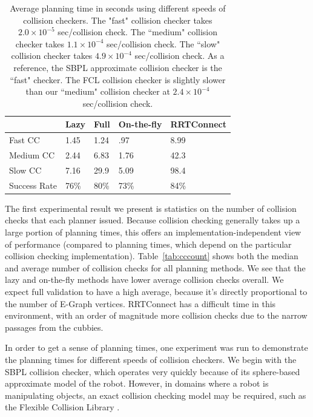 \documentclass[letterpaper, 10 pt, conference]{ieeeconf}  %
\newcommand{\tabref}[1]{Table~\ref{tab:#1}}
\newcommand{\tablab}[1]{\label{tab:#1}}
\begin{document}
\begin{table}[h]
    \begin{center}
        \begin{tabular}{| l | l | l | l | l | }
            \hline
            & Lazy & Full & On-the-fly & RRTConnect \\ \hline
            Fast CC & 1.45 & 1.24 & .97 & 8.99 \\ \hline
            Medium CC & 2.44 & 6.83 & 1.76 & 42.3\\ \hline
            Slow CC & 7.16 & 29.9 & 5.09 & 98.4 \\ \hline
            Success Rate& 76\% & 80\% & 73\% & 84\% \\ \hline
        \end{tabular}
    \end{center}
    \caption{Average planning time in seconds using different speeds of
    collision checkers. The "fast" collision checker takes $2.0\times10^{-5}$
sec/collision check. The ``medium" collision checker takes $1.1\times10^{-4}$
sec/collision check. The ``slow" collision checker takes $4.9\times10^{-4}$
sec/collision check. As a reference, the SBPL approximate collision checker is
the ``fast" checker. The FCL collision checker is slightly slower than our
``medium" collision checker at $2.4\times10^{-4}$ sec/collision check.
}
    \tablab{ptimes}
\end{table}

The first experimental result we present is statistics on the number of
collision checks that each planner issued. Because collision checking generally
takes up a large portion of planning times, this offers an
implementation-independent view of performance (compared to planning times, which
depend on the particular collision checking implementation).  \tabref{cccount}
shows both the median and average number of collision checks for all planning
methods. We see that the lazy and on-the-fly methods have lower average
collision checks overall.  We expect full validation to have a high average,
because it's directly proportional to the number of E-Graph vertices. RRTConnect
has a difficult time in this environment, with an order of magnitude
more collision checks due to the narrow passages from the cubbies.

In order to get a sense of planning times, one experiment was run to demonstrate
the planning times for different speeds of collision checkers.  We begin with
the SBPL collision checker, which operates very quickly because of its
sphere-based approximate model of the robot. However, in domains where a robot
is manipulating objects, an exact collision checking model may be required, such
as the Flexible Collision Library \cite{pan2012fcl}.  
\end{document}

